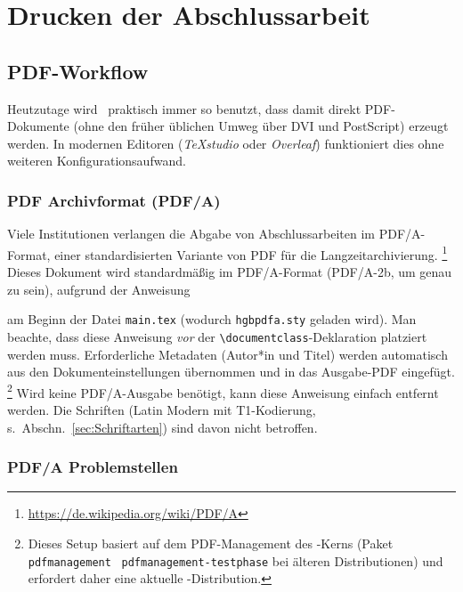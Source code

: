 \chapter{Drucken der Abschlussarbeit}
\label{cha:Drucken}


\section{PDF-Workflow}
\label{sec:pdf}

Heutzutage wird \latex\ praktisch immer so benutzt, dass damit direkt PDF-Dokumente
(ohne den früher üblichen Umweg über DVI und PostScript) erzeugt werden.
In modernen Editoren (\zB \emph{TeXstudio} oder \emph{Overleaf}) funktioniert dies
ohne weiteren Konfigurationsaufwand.


\subsection{PDF Archivformat (PDF/A)}
\label{sec:PDFA}

Viele Institutionen verlangen die Abgabe von Abschlussarbeiten im PDF/A-Format, einer
standardisierten Variante von PDF für die Langzeitarchivierung.%
\footnote{\url{https://de.wikipedia.org/wiki/PDF/A}}
Dieses Dokument wird standardmäßig im PDF/A-Format (PDF/A-2b, um genau zu sein),
aufgrund der Anweisung
%
\begin{LaTeXCode}[numbers=none]
\RequirePackage{hgbpdfa}
\end{LaTeXCode}
%
am Beginn der Datei \verb!main.tex! (wodurch \verb!hgbpdfa.sty! geladen wird).
Man beachte, dass diese Anweisung \emph{vor} der \verb!\documentclass!-Deklaration
platziert werden muss. Erforderliche Meta\-daten (\zB Autor*in und Titel) werden
automatisch aus den Dokumenteinstellungen übernommen und in das Ausgabe-PDF eingefügt.%
\footnote{Dieses Setup basiert auf dem PDF-Management des \latex-Kerns (Paket
\texttt{pdfmanagement} \bzw\ \texttt{pdfmanagement-testphase} bei älteren
Distributionen) und erfordert daher eine aktuelle \latex-Distribution.}
Wird keine PDF/A-Ausgabe benötigt, kann diese Anweisung einfach entfernt werden.
Die Schriften (Latin Modern mit T1-Kodierung, s.\ Abschn.~\ref{sec:Schriftarten})
sind davon nicht betroffen.


\subsection{PDF/A Problemstellen}
\label{sec:PDFA-issues}

